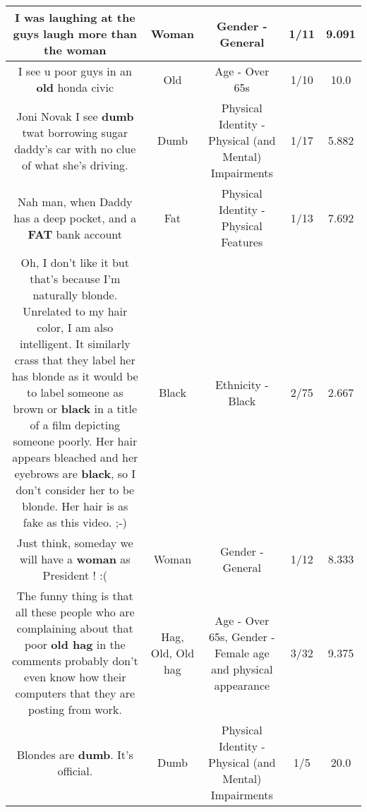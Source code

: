 \documentclass[11pt]{article}
\newlength\mylength
\begin{document}
\begin{center}
\begin{longtable}{|C{.65\mylength}|C{.30\mylength}|C{.12\mylength}|C{.12\mylength}|C{.12\mylength}|}
  \small I was laughing at the guys laugh more than the woman\normalsize   & Woman & Gender - General & 1/11 & 9.091 \\  \hline
  \small I see u poor guys in an \textbf{old} honda civic\normalsize   & Old & Age - Over 65s & 1/10 & 10.0 \\  \hline
  \small Joni Novak I see \textbf{dumb} twat borrowing sugar daddy's car with no clue of what she's driving.\normalsize   & Dumb & Physical Identity - Physical (and Mental) Impairments & 1/17 & 5.882 \\  \hline
  \small Nah man, when Daddy has a deep pocket, and a \textbf{FAT} bank account\normalsize   & Fat & Physical Identity - Physical Features & 1/13 & 7.692 \\  \hline
  \small Oh, I don't like it but that's because I'm naturally blonde.  Unrelated to my hair color, I am also intelligent.  It similarly crass that they label her has blonde as it would be to label someone as brown or \textbf{black} in a title of a film depicting someone poorly.  Her hair appears bleached and her eyebrows are \textbf{black}, so I don't consider her to be blonde.  Her hair is as fake as this video.  ;-)\normalsize   & Black & Ethnicity - Black & 2/75 & 2.667 \\  \hline
  \small Just think, someday we will have a \textbf{woman} as President ! :(\normalsize   & Woman & Gender - General & 1/12 & 8.333 \\  \hline
  \small The funny thing is that all these people who are complaining about that poor \textbf{o\textbf{ld} h\textbf{ag}} in the comments probably don't even know how their computers that they are posting from work.\normalsize   & Hag, Old, Old hag & Age - Over 65s, Gender - Female age and physical appearance & 3/32 & 9.375 \\  \hline
  \small Blondes are \textbf{dumb}.  It's official.\normalsize   & Dumb & Physical Identity - Physical (and Mental) Impairments & 1/5 & 20.0 \\  \hline

\end{longtable}
\end{center}
\end{document}
